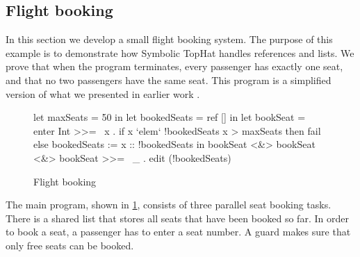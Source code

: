 \subsection{Flight booking}

In this section we develop a small flight booking system.
The purpose of this example is to demonstrate how Symbolic TopHat handles references and lists.
We prove that when the program terminates, every passenger has exactly one seat, and that no two passengers have the same seat.
This program is a simplified version of what we presented in earlier work \cite{Steenvoorden2019}.

\begin{figure}
\begin{TASK}
  let maxSeats = 50 in
  let bookedSeats = ref [] in
  let bookSeat = enter Int >>= \ x .
    if x `elem` !bookedSeats \/ x > maxSeats
      then fail else bookedSeats := x :: !bookedSeats in
  bookSeat <&> bookSeat <&> bookSeat >>= \ _ .
  edit (!bookedSeats)
\end{TASK}
\caption{Flight booking}
\label{fig:flight-booking}
\end{figure}

The main program, shown in \cref{fig:flight-booking}, consists of three parallel seat booking tasks.
There is a shared list that stores all seats that have been booked so far.
In order to book a seat, a passenger has to enter a seat number.
A guard makes sure that only free seats can be booked.
